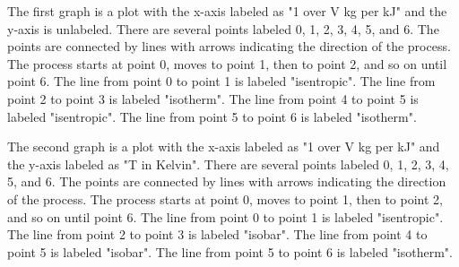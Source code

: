 The first graph is a plot with the x-axis labeled as "1 over V kg per kJ" and the y-axis is unlabeled. There are several points labeled 0, 1, 2, 3, 4, 5, and 6. The points are connected by lines with arrows indicating the direction of the process. The process starts at point 0, moves to point 1, then to point 2, and so on until point 6. The line from point 0 to point 1 is labeled "isentropic". The line from point 2 to point 3 is labeled "isotherm". The line from point 4 to point 5 is labeled "isentropic". The line from point 5 to point 6 is labeled "isotherm".

The second graph is a plot with the x-axis labeled as "1 over V kg per kJ" and the y-axis labeled as "T in Kelvin". There are several points labeled 0, 1, 2, 3, 4, 5, and 6. The points are connected by lines with arrows indicating the direction of the process. The process starts at point 0, moves to point 1, then to point 2, and so on until point 6. The line from point 0 to point 1 is labeled "isentropic". The line from point 2 to point 3 is labeled "isobar". The line from point 4 to point 5 is labeled "isobar". The line from point 5 to point 6 is labeled "isotherm".